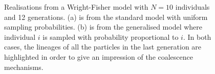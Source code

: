 \documentclass{article}
\begin{document}
\begin{figure}
\centering
{}
\caption{Realisations from a Wright-Fisher model with $N=10$ individuals and 12 generations. (a) is from the standard model with uniform sampling probabilities. (b) is from the generalised model where individual $i$ is sampled with probability proportional to $i$. In both cases, the lineages of all the particles in the last generation are highlighted in order to give an impression of the coalescence mechanisms.}
\end{figure}
\end{document}
